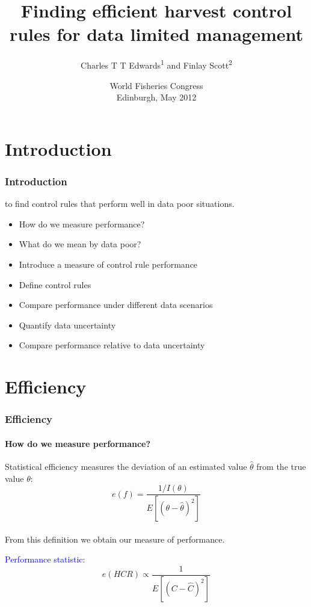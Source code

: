 \documentclass[pdf]{beamer}
\title[Finding efficient HCRs]{
Finding efficient harvest control rules for data limited management
	}
\subtitle{
	}
\author[CE \& FS]{
	Charles T T Edwards\textsuperscript{1} and Finlay Scott\textsuperscript{2}
	}
\institute[ICL and CEFAS]{
	\textsuperscript{1,2}Imperial College London, UK\\\textsuperscript{2}CEFAS, UK
	}
\date[WFC, May 2012]{World Fisheries Congress\\Edinburgh, May 2012}
\begin{document}
\frame{\titlepage}

\section{Introduction}
\begin{frame}
\frametitle{Introduction}
 to find control rules that perform well in data poor situations.
\begin{itemize}
\item How do we measure performance?
\item What do we mean by data poor?
\end{itemize}
\vspace{20pt}
\begin{itemize}
\item Introduce a measure of \alert{control rule performance}
\item Define control rules
\item Compare performance under different data scenarios
\item Quantify \alert{data uncertainty}
\item Compare performance relative to data uncertainty
\end{itemize}
\end{frame}

\section{Efficiency}
\begin{frame}
\frametitle{Efficiency}
\framesubtitle{How do we measure performance?}
Statistical efficiency measures the deviation of an estimated value $\hat{\theta}$ from the true value $\theta$:
\begin{equation}
e(f) = \frac{1/I(\theta)}{E[(\theta - \hat{\theta})^2]} \nonumber
\end{equation}
\vspace{20pt}\\
From this definition we obtain our measure of performance.
\begin{block}{}
\textcolor{blue}{Performance statistic:}
\vspace{5pt}
\begin{equation}
e(HCR) \propto \frac{1}{E[(C - \hat{C})^2]} \nonumber
\end{equation}
\vspace{5pt}
\end{block}
\end{frame}
\end{document}
